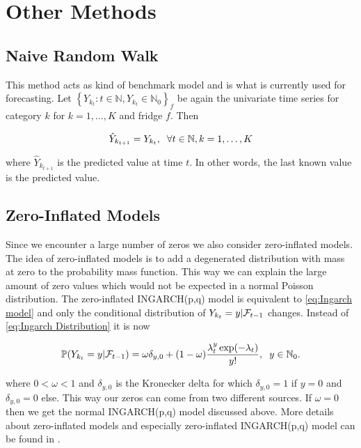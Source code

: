 \section{Other Methods}
\label{sec: Other methods}

\subsection{Naive Random Walk}
\label{sec: Naive Random Walk}

This method acts as kind of benchmark model and is what is currently used for forecasting. Let $\left\{Y_{k_t}:t\in \mathbb{N}, Y_{k_t} \in \mathbb{N}_0\right\}_f$ be again the univariate time series for category $k$ for $k=1,\ldots,K$ and fridge $f$. Then

\begin{equation}
\hat{Y}_{k_{t+1}}= Y_{k_t} ,\hspace{0.2cm} \forall t \in \mathbb{N}, k=1,\ldots,K
\label{eq: Random Walk Model}
\end{equation}

where $\hat{Y}_{k_{t+1}}$ is the predicted value at time $t$. In other words, the last known value is the predicted value. 


\subsection{Zero-Inflated Models}
\label{sec: Zim}

Since we encounter a large number of zeros we also consider zero-inflated models. The idea of zero-inflated models is to add a degenerated distribution with mass at zero to the probability mass function. This way we can explain the large amount of zero values which would not be expected in a normal Poisson distribution. The zero-inflated INGARCH(p,q) model is equivalent to \ref{eq:Ingarch model} and only the conditional distribution of $Y_{k_t}=y | \mathcal{F}_{t-1}$ changes. Instead of \ref{eq:Ingarch Distribution} it is now 

\begin{equation}
\mathbb{P}(Y_{k_t}=y | \mathcal{F}_{t-1}) = \omega \delta_{y,0}+ (1-\omega) \frac{\lambda_t^y \exp(-\lambda_t)}{y!}, \hspace{0.2cm} y \in \mathbb{N}_0.
\label{eq:ZIP Distribution}
\end{equation}

where $0 < \omega < 1$ and $\delta_{y,0}$ is the Kronecker delta for which $\delta_{y,0}=1$ if $y=0$ and $\delta_{y,0}=0$ else. This way our zeros can come from two different sources. If $\omega =0$ then we get the normal INGARCH(p,q) model discussed above. More details about zero-inflated models and especially zero-inflated INGARCH(p,q) model can be found in \cite{Zhu:2012}.


